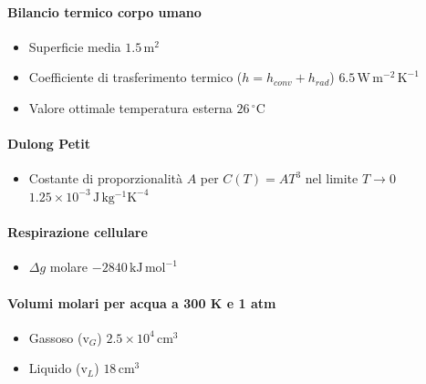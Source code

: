 \documentclass[10pt, oneside]{book}
\begin{document}
\paragraph{Bilancio termico corpo umano}
\begin{itemize}
\item Superficie media \dotfill $ 1.5 \, \mathrm{m^2}$ 
\item Coefficiente di trasferimento termico ($h = h_{conv} + h_{rad}$) \dotfill $ 6.5 \, \mathrm{W \, m^{-2} \, K^{-1}}$ 
\item Valore ottimale temperatura esterna \dotfill $ 26 \, \mathrm{{}^\circ C}$ 
\end{itemize}
\paragraph{Dulong Petit}
\begin{itemize}
\item Costante di proporzionalità $A$ per $C(T) = A T^3$ nel limite $T \rightarrow 0$ \dotfill $ 1.25 \times 10^{-3} \, \mathrm{J \, kg^{-1} K^{-4}}$ 
\end{itemize}
\paragraph{Respirazione cellulare}
\begin{itemize}
\item $\Delta g$ molare \dotfill $ -2840 \, \mathrm{kJ \, mol^{-1}}$
\end{itemize}
\paragraph{Volumi molari per acqua a 300 K e 1 atm}
\begin{itemize}
\item Gassoso ($\mathrm{v}_G$) \dotfill $ 2.5 \times 10^{4} \, \mathrm{cm^{3}}$
\item Liquido ($\mathrm{v}_L$) \dotfill $ 18 \, \mathrm{cm^{3}}$
\end{itemize}
\end{document}
